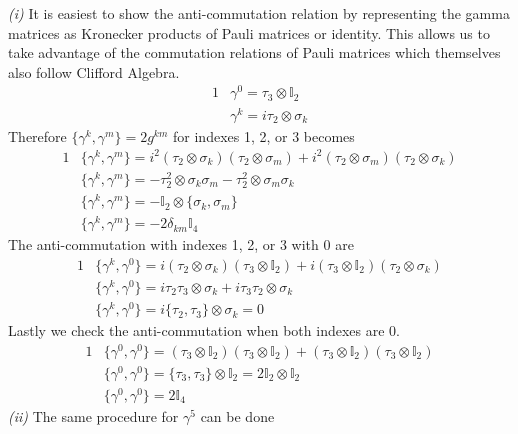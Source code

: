\documentclass[]{article}
\numberwithin{equation}{subsection}
\begin{document}
\noindent\emph{(i)} It is easiest to show the anti-commutation relation by representing the gamma matrices as Kronecker products of Pauli matrices or identity. This allows us to take advantage of the commutation relations of Pauli matrices which themselves also follow Clifford Algebra.
\begin{alignat}{1}
  \label{i43} &\gamma^{0}=\tau_{3}\otimes\mathbb{I}_{2}\\
  \label{i44} &\gamma^{k}=i\tau_{2}\otimes\sigma_{k}
\end{alignat}
Therefore $\{\gamma^{k},\gamma^{m}\}=2g^{km}$ for indexes 1, 2, or 3 becomes
\begin{alignat}{1}
  \label{i45} &\{\gamma^{k},\gamma^{m}\}=i^{2}(\tau_{2}\otimes\sigma_{k})(\tau_{2}\otimes\sigma_{m})+i^{2}(\tau_{2}\otimes\sigma_{m})(\tau_{2}\otimes\sigma_{k})\\
  \label{i46} &\{\gamma^{k},\gamma^{m}\}=-\tau_{2}^{2}\otimes\sigma_{k}\sigma_{m}-\tau_{2}^{2}\otimes\sigma_{m}\sigma_{k}\\
  \label{i47} &\{\gamma^{k},\gamma^{m}\}=-\mathbb{I}_{2}\otimes\{\sigma_{k},\sigma_{m}\}\\
  \label{i48} &\{\gamma^{k},\gamma^{m}\}=-2\delta_{km}\mathbb{I}_{4}
\end{alignat}
The anti-commutation with indexes 1, 2, or 3 with 0 are
\begin{alignat}{1}
  \label{i49} &\{\gamma^{k},\gamma^{0}\}=i(\tau_{2}\otimes\sigma_{k})(\tau_{3}\otimes\mathbb{I}_{2})+i(\tau_{3}\otimes\mathbb{I}_{2})(\tau_{2}\otimes\sigma_{k})\\
  \label{i50} &\{\gamma^{k},\gamma^{0}\}=i\tau_{2}\tau_{3}\otimes\sigma_{k}+i\tau_{3}\tau_{2}\otimes\sigma_{k}\\
  \label{i51} &\{\gamma^{k},\gamma^{0}\}=i\{\tau_{2},\tau_{3}\}\otimes\sigma_{k}=0
\end{alignat}
Lastly we check the anti-commutation when both indexes are 0.
\begin{alignat}{1}
  \label{i52} &\{\gamma^{0},\gamma^{0}\}=(\tau_{3}\otimes\mathbb{I}_{2})(\tau_{3}\otimes\mathbb{I}_{2})+(\tau_{3}\otimes\mathbb{I}_{2})(\tau_{3}\otimes\mathbb{I}_{2})\\
  \label{i53} &\{\gamma^{0},\gamma^{0}\}=\{\tau_{3},\tau_{3}\}\otimes\mathbb{I}_{2}=2\mathbb{I}_{2}\otimes\mathbb{I}_{2}\\
  \label{i54} &\{\gamma^{0},\gamma^{0}\}=2\mathbb{I}_{4}
\end{alignat}
\emph{(ii)} The same procedure for $\gamma^{5}$ can be done
\end{document}
